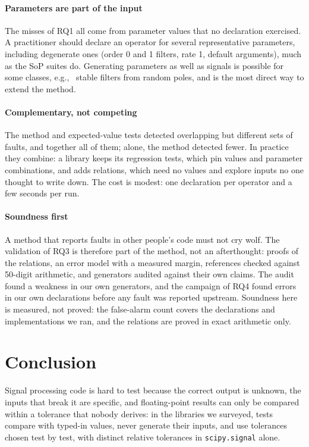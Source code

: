 \documentclass[10pt,conference]{IEEEtran}
\newcommand{\code}[1]{\texttt{#1}}
\newcommand{\eg}{e.g.,\ }
\begin{document}
\paragraph*{Parameters are part of the input} The misses of RQ1 all come from
parameter values that no declaration exercised. A practitioner should declare
an operator for several representative parameters, including degenerate ones
(order 0 and 1 filters, rate 1, default arguments), much as the SoP suites do.
Generating parameters as well as signals is possible for some classes, \eg
stable filters from random poles, and is the most direct way to extend the
method.

\paragraph*{Complementary, not competing} The method and expected-value tests
detected overlapping but different sets of faults, and together all of them;
alone, the method detected fewer. In practice they
combine: a library keeps its regression tests, which pin values and parameter
combinations, and adds relations, which need no values and explore inputs no
one thought to write down. The cost is modest: one declaration per operator and
a few seconds per run.

\paragraph*{Soundness first} A method that reports faults in other people's code
must not cry wolf. The validation of RQ3 is therefore part of the method, not an
afterthought: proofs of the relations, an error model with a measured margin,
references checked against 50-digit arithmetic, and generators audited against
their own claims. The audit found a weakness in our own generators, and the
campaign of RQ4 found \campaignTriaged{} errors in our own declarations before any fault was
reported upstream. Soundness here is measured, not proved: the false-alarm
count covers the declarations and implementations we ran, and the relations
are proved in exact arithmetic only.

\section{Conclusion}
\label{sec:conclusion}
Signal processing code is hard to test because the correct output is unknown,
the inputs that break it are specific, and floating-point results can only be
compared within a tolerance that nobody derives: in the libraries we surveyed,
tests compare with typed-in values, never generate their inputs, and use
tolerances chosen test by test, with \surveyScipyRelDistinct{} distinct relative
tolerances in \code{scipy.signal} alone.
\end{document}
